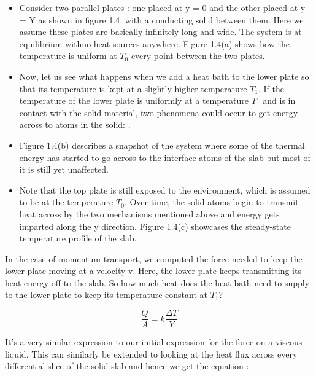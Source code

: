\begin{itemize}
    \item Consider two parallel plates : one placed at y = 0 and the other placed at y = Y as shown in figure 1.4, with a conducting solid between them. Here we assume these plates are basically infinitely long and wide. The system is at equilibrium withno heat sources anywhere. Figure 1.4(a) shows how the temperature is uniform at $T_{0}$ every point between the two plates. 

    \item Now, let us see what happens when we add a heat bath to the lower plate so that its temperature is kept at a slightly higher temperature $T_{1}$. If the temperature of the lower plate is uniformly at a temperature $T_{1}$ and is in contact with the solid material, two phenomena could occur to get energy across to atoms in the solid: 
        . 

    \item Figure 1.4(b) describes a snapshot of the system where some of the thermal energy has started to go across to the interface atoms of the slab but most of it is still yet unaffected.

    \item Note that the top plate is still exposed to the environment, which is assumed to be at the temperature $T_{0}$. Over time, the solid atoms begin to transmit heat across by the two mechanisms mentioned above and energy gets imparted along the y direction. Figure 1.4(c) showcases the steady-state temperature profile of the slab.
\end{itemize}

In the case of momentum transport, we computed the force needed to keep the lower plate moving at a velocity v. Here, the lower plate keeps transmitting its heat energy off to the slab. So how much heat does the heat bath need to supply to the lower plate to keep its temperature constant at $T_{1}$?

$$\frac{Q}{A} = k \frac{\Delta T}{Y}$$

It's a very similar expression to our initial expression for the force on a viscous liquid. This can similarly be extended to looking at the heat flux across every differential slice of the solid slab and hence we get the equation :

